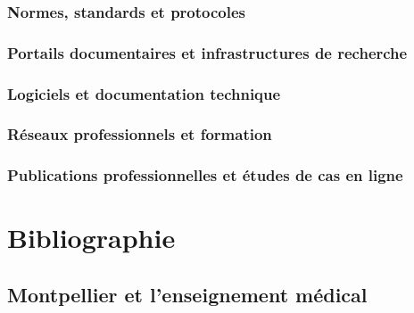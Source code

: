 \subsubsection*{Normes, standards et protocoles}

\printbibliography[
heading=none,
keyword=src-num-normes
]

\subsubsection*{Portails documentaires et infrastructures de recherche}

\printbibliography[
heading=none,
keyword=src-num-plateformes
]

\subsubsection*{Logiciels et documentation technique}

\printbibliography[
heading=none,
keyword=src-num-logiciels
]

\subsubsection*{Réseaux professionnels et formation}

\printbibliography[
heading=none,
keyword=src-num-reseaux-pro
]

\subsubsection*{Publications professionnelles et études de cas en ligne}

\printbibliography[
heading=none,
keyword=src-num-publications
]

\newpage


\section*{Bibliographie}

\subsection*{Montpellier et l'enseignement médical}

